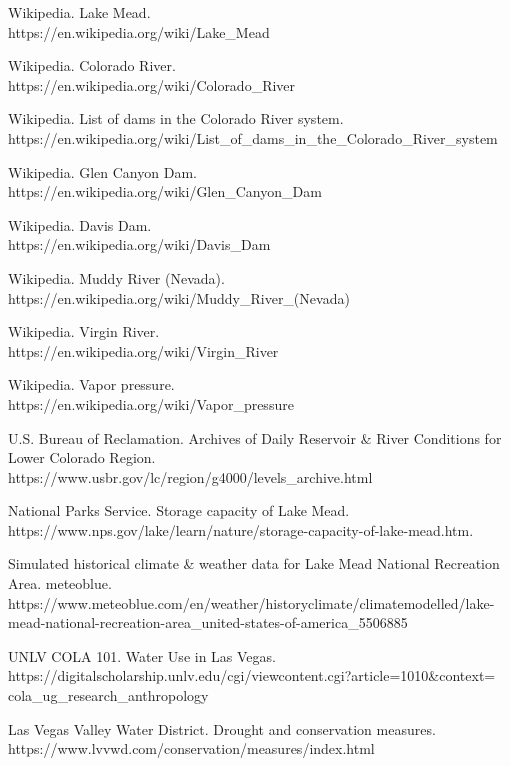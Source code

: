 \documentclass[12pt]{article}
\newcommand{\wholepages}{21}
\theoremstyle{definition}
\theoremstyle{remark}
\numberwithin{equation}{section}
\begin{document}
\newpage
\thispagestyle{empty}
\renewcommand\refname{Reference}
\clearpage
{}
\begin{thebibliography}{100}
	 Wikipedia. Lake Mead.\\ https://en.wikipedia.org/wiki/Lake\_Mead

	 Wikipedia. Colorado River.\\ https://en.wikipedia.org/wiki/Colorado\_River

	 Wikipedia. List of dams in the Colorado River system.\\ https://en.wikipedia.org/wiki/List\_of\_dams\_in\_the\_Colorado\_River\_system

	 Wikipedia. Glen Canyon Dam.\\ https://en.wikipedia.org/wiki/Glen\_Canyon\_Dam

	 Wikipedia. Davis Dam.\\ https://en.wikipedia.org/wiki/Davis\_Dam

	 Wikipedia. Muddy River (Nevada).\\ https://en.wikipedia.org/wiki/Muddy\_River\_(Nevada)

	 Wikipedia. Virgin River.\\ https://en.wikipedia.org/wiki/Virgin\_River

	 Wikipedia. Vapor pressure.\\ https://en.wikipedia.org/wiki/Vapor\_pressure

	 U.S. Bureau of Reclamation. Archives of Daily Reservoir \& River Conditions for Lower Colorado Region.\\ https://www.usbr.gov/lc/region/g4000/levels\_archive.html

	 National Parks Service. Storage capacity of Lake Mead.\\ https://www.nps.gov/lake/learn/nature/storage-capacity-of-lake-mead.htm.

	 Simulated historical climate \& weather data for Lake Mead National Recreation Area. meteoblue.\\ https://www.meteoblue.com/en/weather/historyclimate/climatemodelled/lake-mead-national-recreation-area\_united-states-of-america\_5506885

	 UNLV COLA 101. Water Use in Las Vegas.\\ https://digitalscholarship.unlv.edu/cgi/viewcontent.cgi?article=1010\&context= cola\_ug\_research\_anthropology

	 Las Vegas Valley Water District. Drought and conservation measures.\\ https://www.lvvwd.com/conservation/measures/index.html

\end{thebibliography}
	
\end{document}
